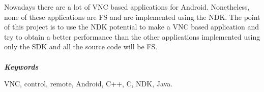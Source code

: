 
Nowadays there are a lot of VNC based applications for Android. Nonetheless, none of these applications are FS and are implemented using the NDK. The point of this project is to use the NDK potential to make a VNC based application and try to obtain a better performance than the other applications implemented using only the SDK and all the source code will be FS.
\\ \mbox{ } \\
\textit{\textbf{Keywords}}

VNC, control, remote, Android, C++, C, NDK, Java.
